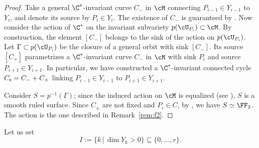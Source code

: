 \documentclass[11pt]{amsart}
\numberwithin{equation}{section}
\theoremstyle{definition}
\theoremstyle{remark}
\begin{document}
\begin{proof}
Take a general $\C^*$-invariant curve $C_-$ in $\cM$ connecting $P_{i-1}\in Y_{i-1}$ to $Y_i$, and denote its source by $P_{i}\in Y_i$.  The existence of $C_-$ is guaranteed by \cite[Theorem~5.3]{OS2}. Now consider the action of $\C^*$ on the invariant subvariety $p(\cU_{P_i})\subset\cM$. By construction, the element $[C_-]$ belongs to the sink of the action on $p(\cU_{P_i})$. Let $\Gamma \subset p(\cU_{P_i})$ be the closure of a general orbit with sink $[C_-]$. Its source $[C_+]$ parametrizes a $\C^*$-invariant curve $C_-$ in $\cM$ with sink $P_i$ and source $P_{i+1} \in Y_{i+1}$.  In particular, we have constructed a $\C^*$-invariant connected cycle $C_{\mbox{\scriptsize{s}}} = C_-+C_+$ linking $P_{i-1}\in Y_{i-1}$ to $P_{i+1}\in Y_{i+1}$.

Consider $S= p^{-1}(\Gamma)$; since the induced action on $\cM$ is equalized (see \cite[Proposition 4.5]{OS2}), $S$ is a smooth ruled surface. Since $C_\pm$ are not fixed and $P_i \in C$, by \cite[Proposition 4.6]{OS2}, we have $S \simeq \FF_2$. The action is the one described in Remark~\ref{rem:f2}.
\end{proof}

Let us set
\begin{equation}\label{eq:I}
I :=\{k\,|\, \dim Y_k >0\}\subseteq \{0,\dots, r\}.
\end{equation}
\end{document}

